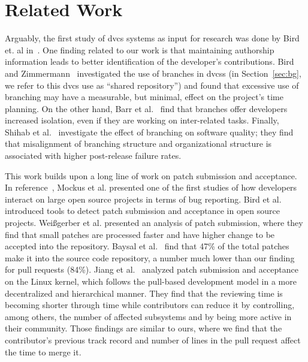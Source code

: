 \documentclass{sig-alternate}
\begin{document}
\section{Related Work}


Arguably, the first study of {\sc dvcs} systems as input for research was done
by Bird et. al in~\cite{Bird09}. One finding related to our work is that
maintaining authorship information leads to better identification of the
developer's contributions. Bird and Zimmermann~\cite{Bird12} investigated the
use of branches in {\sc dvcs}s (in Section~\ref{sec:bg}, we refer to this {\sc
dvcs} use as ``shared repository'') and found that excessive use of branching
may have a measurable, but minimal, effect on the project's time planning.
On the other hand, Barr et al.~\cite{Barr12} find that branches offer developers
increased isolation, even if they are working on inter-related tasks.
Finally, Shihab et al.~\cite{Shiha12} investigate the effect of branching on
software quality; they find that misalignment of branching structure and organizational structure is associated with higher post-release failure rates.

This work builds upon a long line of work on patch submission and acceptance.
In reference~\cite{MOCKU02}, Mockus et al. presented one of the first studies of
how developers interact on large open source projects in terms of bug reporting.
Bird et al.~\cite{Bird07a} introduced tools to detect patch submission and
acceptance in open source projects. Wei\ss gerber et al. presented an analysis
of patch submission, where they find that small patches are processed faster and
have higher change to be accepted into the repository. Baysal et
al.~\cite{Baysa12} find that 47\% of the total patches make it into the source
code repository, a number much lower than our finding for pull requests (84\%).
Jiang et al.~\cite{Jiang13} analyzed patch submission and acceptance on the
Linux kernel, which follows the pull-based development model in a more
decentralized and hierarchical manner. They find that the reviewing time is
becoming shorter through time while contributors can reduce it by controlling,
among others, the number of affected subsystems and by being more active in
their community. Those findings are similar to ours, where we find that the
contributor's previous track record and number of lines in the pull request
affect the time to merge it.
\end{document}
